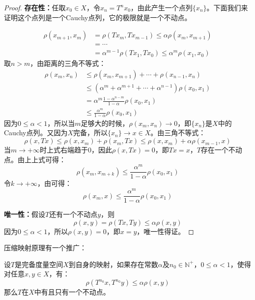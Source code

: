 \begin{proof}
	\textbf{存在性：}任取$x_0\in X$，令$x_n=T^nx_0$，由此产生一个点列$\{x_n\}$。下面我们来证明这个点列是一个Cauchy点列，它的极限就是一个不动点。\par
	\begin{align*}
		\rho(x_{m+1},x_m)&=\rho(Tx_m,Tx_{m-1})\leqslant\alpha\rho(x_m,x_{m+1}) \\
		&=\cdots \\
		&=\alpha^{m-1}\rho(Tx_1,Tx_0)\leqslant\alpha^m\rho(x_1,x_0)
	\end{align*}
	取$n>m$，由距离的三角不等式：
	\begin{align*}
		\rho(x_m,x_n)
		&\leqslant\rho(x_m,x_{m+1})+\cdots+\rho(x_{n-1},x_n) \\
		&\leqslant(\alpha^m+\alpha^{m+1}+\cdots+\alpha^{n-1})\rho(x_0,x_1) \\
		&=\alpha^m\frac{1-\alpha^{n-m}}{1-\alpha}\rho(x_0,x_1) \\
		&\leqslant\frac{\alpha^m}{1-\alpha}\rho(x_0,x_1)
	\end{align*}
	因为$0\leqslant\alpha<1$，所以当$m$足够大的时候，$\rho(x_m,x_n)\rightarrow 0$，即$\{x_n\}$是$X$中的Cauchy点列。又因为$X$完备，所以$\{x_n\}\rightarrow x\in X$。由三角不等式：
	\begin{equation*}
		\rho(x,Tx)\leqslant\rho(x,x_m)+\rho(x_m,Tx)\leqslant\rho(x,x_m)+\alpha\rho(x_{m-1},x)
	\end{equation*}
	当$m\to+\infty$时上式右端趋于0，因此$\rho(x,Tx)=0$，即$Tx=x$，$T$存在一个不动点。由上上式可得：
	\begin{equation*}
		\rho(x_m,x_{m+k})\leqslant\frac{\alpha^m}{1-\alpha}\rho(x_0,x_1)
	\end{equation*}
	令$k\to+\infty$，由可得：
	\begin{equation*}
		\rho(x_m,x)\leqslant\frac{\alpha^m}{1-\alpha}\rho(x_0,x_1)
	\end{equation*}\par
	\textbf{唯一性：}假设$T$还有一个不动点$y$，则
	\begin{equation*}
		\rho(x,y)=\rho(Tx,Ty)\leqslant\alpha\rho(x,y)
	\end{equation*}
	因为$0\leqslant\alpha<1$，所以$\rho(x,y)=0$，即$x=y$，唯一性得证。
\end{proof}
压缩映射原理有一个推广：
\begin{theorem}
	设$T$是完备度量空间$X$到自身的映射，如果存在常数$\alpha$及$n_0\in\mathbb{N}^+$，$0\leqslant\alpha<1$，使得对任意$x,y\in X$，有：
	\begin{equation*}
		\rho(T^{n_0}x,T^{n_0}y)\leqslant\alpha\rho(x,y)
	\end{equation*}
	那么$T$在$X$中有且只有一个不动点。
\end{theorem}
